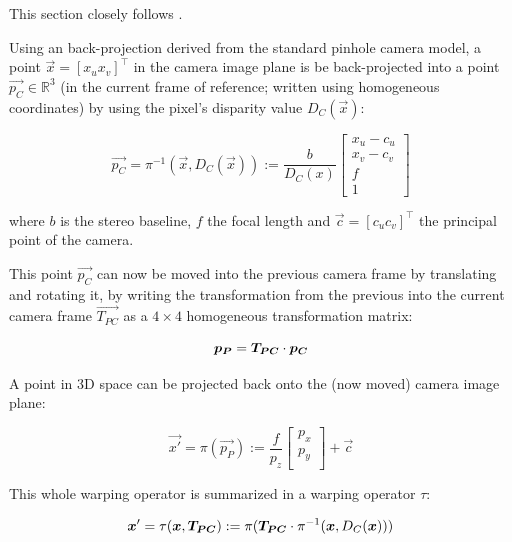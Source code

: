 This section closely follows \cite{omaridenseodometry}.

Using an back-projection derived from the standard pinhole camera model, a
point $ \vec{x} = [ x_u  x_v ]^\intercal $ in the camera image plane is be back-projected into a point $
\vec{p_C} \in \mathbb{R}^3 $ (in the current frame of reference; written using
homogeneous coordinates) by using the pixel's disparity value $D_C(\vec{x})$:

\begin{equation}
    \label{eq:backprojection}
    \vec{p_C} = \pi^{-1}(\vec{x}, D_C(\vec{x})) := \frac{b}{D_C(x)}
    \begin{bmatrix}
        x_u - c_u \\
        x_v - c_v \\
        f \\
        1
    \end{bmatrix}
\end{equation}

where $b$ is the stereo baseline, $f$ the focal length and $\vec{c} = [ c_u c_v ]^\intercal$ the principal point of the camera.

This point $\vec{p_C}$ can now be moved into the previous camera frame by translating
and rotating it, by writing the transformation from the previous into the
current camera frame $\vec{T_{PC}}$ as a $4 \times 4$ homogeneous
transformation matrix:

\begin{equation}
    \vec{p_P} = \mat{T_{PC}} \cdot \vec{p_C}
\end{equation}

A point in 3D space can be projected back onto the (now moved) camera image plane:

\begin{equation}
    \label{eq:projection}
    \vec{x'} = \pi(\vec{p_P}) := \frac{f}{p_{z}}
    \begin{bmatrix}
        p_{x} \\
        p_{y} \\
    \end{bmatrix}
    + \vec{c}
\end{equation}

This whole warping operator is summarized in a warping operator $\tau$:

\begin{equation}
    \vec{x'} = \tau(\vec{x}, \vec{T_{PC}}) := \pi( \mat{T_{PC}} \cdot \pi^{-1} (\vec{x}, D_C(\vec{x})))
\end{equation}


